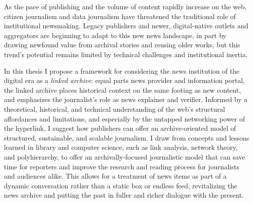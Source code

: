 % 
% 
%
As the pace of publishing and the volume of content rapidly increase on the web, citizen journalism and data journalism have threatened the traditional role of institutional newsmaking. Legacy publishers and newer, digital-native outlets and aggregators are beginning to adapt to this new news landscape, in part by drawing newfound value from archival stories and reusing older works, but this trend's potential remains limited by technical challenges and institutional inertia.

In this thesis I propose a framework for considering the news institution of the digital era as a \emph{linked archive}: equal parts news provider and information portal, the linked archive places historical context on the same footing as new content, and emphasizes the journalist's role as news explainer and verifier. Informed by a theoretical, historical, and technical understanding of the web's structural affordances and limitations, and especially by the untapped networking power of the hyperlink, I suggest how publishers can offer an archive-oriented model of structured, sustainable, and scalable journalism. I draw from concepts and lessons learned in library and computer science, such as link analysis, network theory, and polyhierarchy, to offer an archivally-focused journalistic model that can save time for reporters and improve the research and reading process for journalists and audiences alike. This allows for a treatment of news items as part of a dynamic conversation rather than a static box or endless feed, revitalizing the news archive and putting the past in fuller and richer dialogue with the present.